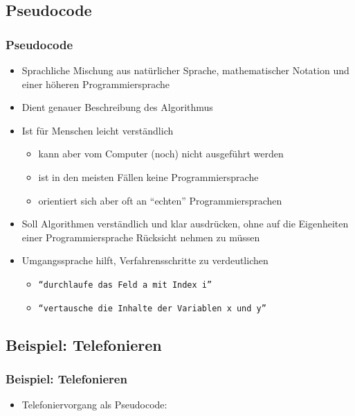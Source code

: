   \subsection{Pseudocode}
  \begin{frame}
      \frametitle{Pseudocode}
      \begin{itemize}
          \item Sprachliche Mischung aus natürlicher Sprache, mathematischer Notation und einer höheren Programmiersprache
          \item Dient genauer Beschreibung des Algorithmus
          \item Ist für Menschen leicht verständlich
          \begin{itemize}
              \item kann aber vom Computer (noch) nicht ausgeführt werden
              \item ist in den meisten Fällen keine Programmiersprache
              \item orientiert sich aber oft an ``echten'' Programmiersprachen
          \end{itemize}
          \item Soll Algorithmen verständlich und klar ausdrücken, ohne auf die Eigenheiten einer Programmiersprache Rücksicht nehmen zu müssen
          \item Umgangssprache hilft, Verfahrensschritte zu verdeutlichen
          \begin{itemize}
            \item \texttt{``durchlaufe das Feld a mit Index i''}
            \item \texttt{``vertausche die Inhalte der Variablen x und y''}
          \end{itemize}
      \end{itemize}
  \end{frame}

  \subsection{Beispiel: Telefonieren}
  \begin{frame}
      \frametitle{Beispiel: Telefonieren}
      \begin{itemize}
          \item Telefoniervorgang als Pseudocode:
          
      \end{itemize}
    \end{frame}

